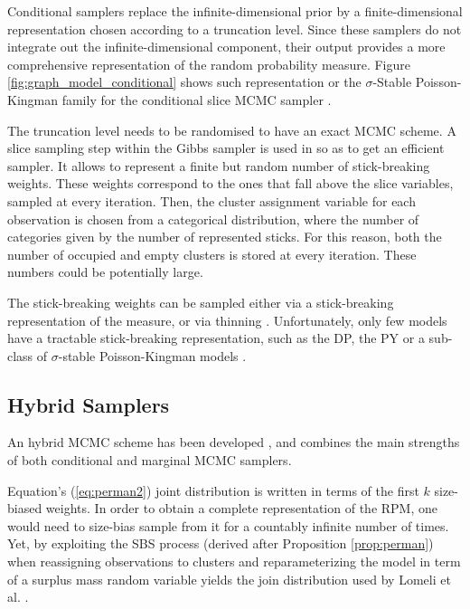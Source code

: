 Conditional samplers replace the infinite-dimensional prior by a finite-dimensional representation chosen according to a truncation level. Since these samplers do not integrate out the infinite-dimensional component, their output provides a more comprehensive representation of the random probability measure.
Figure \ref{fig:graph_model_conditional} shows such representation or the $\sigma$-Stable Poisson-Kingman family for the conditional slice \gls{MCMC} sampler \cite{FavaroWalker2012}.

The truncation level needs to be randomised to have an exact \gls{MCMC} scheme. A slice sampling step \cite{neal2003} within the Gibbs sampler is used in \cite{Favaro:2013fl} so as to get an efficient sampler.
It allows to represent a finite but random number of stick-breaking weights. These weights correspond to the ones that fall above the slice variables, sampled at every iteration. Then, the cluster assignment variable for each observation is chosen from a categorical distribution, where the number of categories given by the number of represented sticks. For this reason, both the number of occupied and empty clusters is stored at every iteration. These numbers could be potentially large.

The stick-breaking weights can be sampled either via a stick-breaking representation of the measure, or via thinning \cite{Favaro:2013fl}. Unfortunately, only few models have a tractable stick-breaking representation, such as the \gls{DP}, the \gls{PY} or a sub-class of $\sigma$-stable Poisson-Kingman models \cite{Favaro:2014bo}.


\subsection{Hybrid Samplers}

An hybrid \gls{MCMC} scheme has been developed \cite{Lomeli:2015vd}, and combines the main strengths of both conditional and marginal \gls{MCMC} samplers.

Equation's (\ref{eq:perman2}) joint distribution is written in terms of the first $k$ size-biased weights. In order to obtain a complete representation of the \gls{RPM}, one would need to size-bias sample from it for a countably infinite number of times.
Yet, by exploiting the \acrlong{SBS} process (derived after Proposition \ref{prop:perman}) when reassigning observations to clusters and reparameterizing the model in term of a surplus mass random variable yields the join distribution used by Lomeli et al. \cite{Lomeli:2015vd}.

